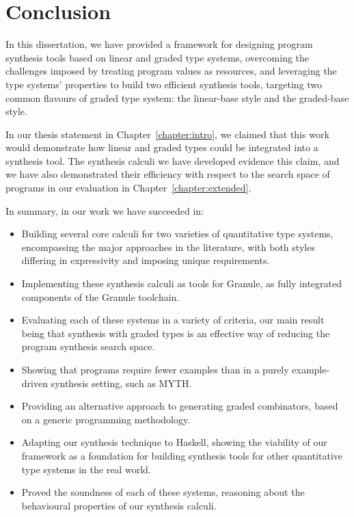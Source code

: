 \chapter{Conclusion}
\label{chapter:conclusion}
In this dissertation, we have provided a framework for designing program
synthesis tools based on linear and graded type systems, overcoming the
challenges imposed by treating program values as resources, and leveraging the
type systems' properties to build two efficient synthesis tools, targeting two
common flavours of graded type system: the linear-base style and the graded-base
style. 

In our thesis statement in Chapter~\ref{chapter:intro}, we claimed that this
work would demonstrate how linear and graded types could be integrated into a
synthesis tool. The synthesis calculi we have developed evidence this claim, and
we have also demonstrated their efficiency with respect to the search space of
programs in our evaluation in Chapter~\ref{chapter:extended}. 

In summary, in our work we have succeeded in: 
\begin{itemize}
    \item Building several core calculi for two varieties of quantitative type
          systems, encompassing the major approaches in the literature, with
          both styles differing in expressivity and imposing unique
          requirements. 
    \item Implementing these synthesis calculi as tools for Granule, as fully
          integrated components of the Granule toolchain. 
    \item Evaluating each of these systems in a variety of criteria, our main
          result being that synthesis with graded types is an effective way of
          reducing the program synthesis search space.  
    \item Showing that programs require fewer examples than in a purely
          example-driven synthesis setting, such as \textsc{MYTH}. 
    \item Providing an alternative approach to generating graded combinators,
    based on a generic programming methodology. 
    \item Adapting our synthesis technique to Haskell, showing the viability of
          our framework as a foundation for building synthesis tools for other
          quantitative type systems in the real world.
    \item Proved the soundness of each of these systems, reasoning about the
          behavioural properties of our synthesis calculi. 
\end{itemize}

